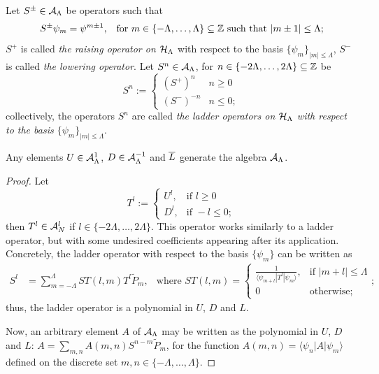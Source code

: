 \begin{definition}\label{definitionLadderOperatorsHLambda}
Let $S^\pm \in \mathcal A_{\Lambda}$ be operators such that
\begin{align}
    S^\pm \psi_m &= \psi^{m\pm 1}, & \text{for }m \in \{-\Lambda, \dots, \Lambda\} \subseteq \mathbb{Z} \text{ such that } |m \pm 1| \leq \Lambda;
\end{align}
$S^+$ is called \emph{the raising operator on $\mathcal H_\Lambda$} with respect to the basis $\{\psi_m\}_{|m| \leq \Lambda}$,  $S^-$ is called \emph{the lowering operator}. Let $S^n \in \mathcal A_\Lambda$, for $n \in \{-2\Lambda, \dots, 2\Lambda\} \subseteq \mathbb{Z}$ be
\begin{equation}
    S^n := \begin{cases}
    (S^+)^n & n \geq 0\\
    (S^-)^{-n} & n \leq 0;
    \end{cases}
\end{equation}
collectively, the operators $S^n$ are called \emph{the ladder operators on $\mathcal H_\Lambda$ with respect to the basis $\{\psi_m\}_{|m|\leq \Lambda}$}.
\end{definition}

\begin{lemma}\label{lemmaLUDScalarAngularMomentumGenerateD2}
Any elements $U \in \mathcal A^1_\Lambda$, $D \in \mathcal A^{-1}_\Lambda$ and $\overline{L}$ generate the algebra $\mathcal A_\Lambda$.
\end{lemma}
\begin{proof}
Let
\begin{equation*}
    T^l := 
    \begin{cases}
    U^l, &   \text{if } l \geq 0\\
    D^l, &   \text{if } -l \leq 0;
    \end{cases}
\end{equation*}
then $T^l \in \mathcal A_N^l$ if $l \in \{-2\Lambda, \dots, 2\Lambda\}$. This operator works similarly to a ladder operator, but with some undesired coefficients appearing after its application. Concretely, the ladder operator with respect to the basis $\{\psi_m\}$ can be written as
\begin{align}\label{equationFormulaGeneralLadderOperatorD2}
    S^l &= \sum_{m = -\Lambda}^\Lambda ST(l,m) T^l \tilde P_m, & \text{where }
    ST(l,m) =
        \begin{cases}
        \frac{1}{\langle \psi_{m+l}| T^l | \psi_{m}\rangle}, & \text{if } |m+l| \leq \Lambda\\
        0 & \text{otherwise;}
        \end{cases};
\end{align}
thus, the ladder operator is a polynomial in $U$, $D$ and $L$.

Now, an arbitrary element $A$ of $\mathcal A_\Lambda$ may be written as the polynomial in $U$, $D$ and $L$: $A =\sum_{m,n} A(m,n) S^{n-m} \tilde P_m$, for the function $A(m,n) = \langle \psi_n | A |\psi_m \rangle$ defined on the discrete set $m,n \in \{-\Lambda, \dots, \Lambda\}$.
\end{proof}

